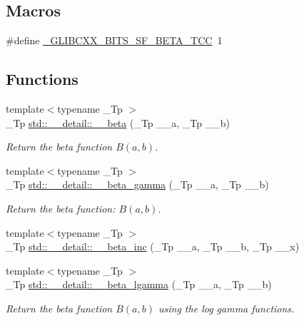 \subsection*{Macros}
\begin{DoxyCompactItemize}
\item 
\#define \hyperlink{sf__beta_8tcc_a41fb0de3283ace5ea2b676d932ff3d32}{\+\_\+\+G\+L\+I\+B\+C\+X\+X\+\_\+\+B\+I\+T\+S\+\_\+\+S\+F\+\_\+\+B\+E\+T\+A\+\_\+\+T\+CC}~1
\end{DoxyCompactItemize}
\subsection*{Functions}
\begin{DoxyCompactItemize}
\item 
{\footnotesize template$<$typename \+\_\+\+Tp $>$ }\\\+\_\+\+Tp \hyperlink{namespacestd_1_1____detail_a090d2f0920e0d208c467609b2a81d717}{std\+::\+\_\+\+\_\+detail\+::\+\_\+\+\_\+beta} (\+\_\+\+Tp \+\_\+\+\_\+a, \+\_\+\+Tp \+\_\+\+\_\+b)
\begin{DoxyCompactList}\small\item\em Return the beta function $ B(a,b) $. \end{DoxyCompactList}\item 
{\footnotesize template$<$typename \+\_\+\+Tp $>$ }\\\+\_\+\+Tp \hyperlink{namespacestd_1_1____detail_a93cfa67cc3f14564925ed3153e055cd1}{std\+::\+\_\+\+\_\+detail\+::\+\_\+\+\_\+beta\+\_\+gamma} (\+\_\+\+Tp \+\_\+\+\_\+a, \+\_\+\+Tp \+\_\+\+\_\+b)
\begin{DoxyCompactList}\small\item\em Return the beta function\+: $ B(a,b) $. \end{DoxyCompactList}\item 
{\footnotesize template$<$typename \+\_\+\+Tp $>$ }\\\+\_\+\+Tp \hyperlink{namespacestd_1_1____detail_aedfe43a9c0065cc3883df50536a625e4}{std\+::\+\_\+\+\_\+detail\+::\+\_\+\+\_\+beta\+\_\+inc} (\+\_\+\+Tp \+\_\+\+\_\+a, \+\_\+\+Tp \+\_\+\+\_\+b, \+\_\+\+Tp \+\_\+\+\_\+x)
\item 
{\footnotesize template$<$typename \+\_\+\+Tp $>$ }\\\+\_\+\+Tp \hyperlink{namespacestd_1_1____detail_ac4f233100713779d93e4eee7665bd0a5}{std\+::\+\_\+\+\_\+detail\+::\+\_\+\+\_\+beta\+\_\+lgamma} (\+\_\+\+Tp \+\_\+\+\_\+a, \+\_\+\+Tp \+\_\+\+\_\+b)
\begin{DoxyCompactList}\small\item\em Return the beta function $B(a,b)$ using the log gamma functions. \end{DoxyCompactList}\item 

\end{DoxyCompactItemize}
